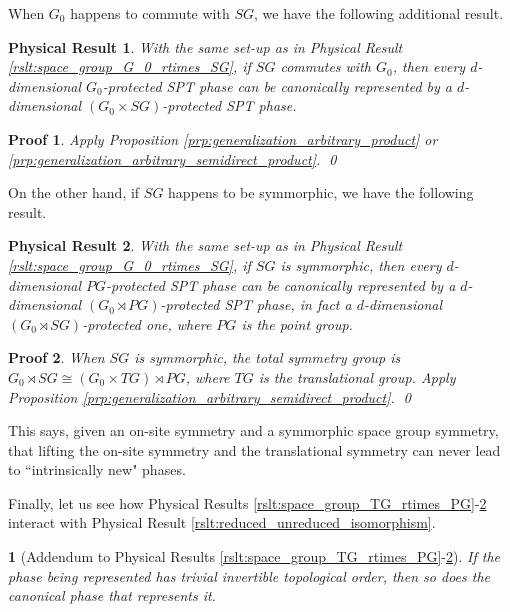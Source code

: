 \documentclass[sort&compress]{elsarticle}
\theoremstyle{theoremstyle}
\theoremstyle{framedtheoremstyle}
\newtheorem{rslt}{Physical Result}
\theoremstyle{definitionstyle}
\theoremstyle{definitionstyle}
\theoremstyle{definitionstyle}
\theoremstyle{definitionstyle}
\theoremstyle{nameddefinitionstyle}
\theoremstyle{framednameddefinitionstyle}
\newtheorem*{framednameddef}{}
\theoremstyle{proofstyle}
\newtheorem{pf}{Proof}
\theoremstyle{definitionstyle}
\newcommand{\isomorphic}{\cong}
\newcommand{\paren}[1]{\left( #1 \right)}
\begin{document}
When $G_0$ happens to commute with $SG$, we have the following additional result.

\begin{framed}\begin{rslt}\label{rslt:space_group_G_0_times_SG}
With the same set-up as in Physical Result \ref{rslt:space_group_G_0_rtimes_SG}, if $SG$ commutes with $G_0$, then every $d$-dimensional $G_0$-protected SPT phase can be canonically represented by a $d$-dimensional $\paren{G_0 \times SG}$-protected SPT phase.
\end{rslt}\end{framed}

\begin{pf}
Apply Proposition \ref{prp:generalization_arbitrary_product} or \ref{prp:generalization_arbitrary_semidirect_product}.
\qed\end{pf}

On the other hand, if $SG$ happens to be symmorphic, we have the following result.

\begin{framed}\begin{rslt}\label{rslt:space_group_G_0_times_TG_rtimes_PG}
With the same set-up as in Physical Result \ref{rslt:space_group_G_0_rtimes_SG}, if $SG$ is symmorphic, then every $d$-dimensional $PG$-protected SPT phase can be canonically represented by a $d$-dimensional $\paren{G_0 \rtimes PG}$-protected SPT phase, in fact a $d$-dimensional $\paren{G_0 \rtimes SG}$-protected one, where $PG$ is the point group.
\end{rslt}\end{framed}

\begin{pf}
When $SG$ is symmorphic, the total symmetry group is $G_0 \rtimes SG \isomorphic \paren{G_0 \times TG} \rtimes PG$, where $TG$ is the translational group. Apply Proposition \ref{prp:generalization_arbitrary_semidirect_product}.
\qed\end{pf}

This says, given an on-site symmetry and a symmorphic space group symmetry, that lifting the on-site symmetry and the translational symmetry can never lead to ``intrinsically new" phases.

Finally, let us see how Physical Results \ref{rslt:space_group_TG_rtimes_PG}-\ref{rslt:space_group_G_0_times_TG_rtimes_PG} interact with Physical Result \ref{rslt:reduced_unreduced_isomorphism}.

\begin{framed}\begin{framednameddef}[Addendum to Physical Results \ref{rslt:space_group_TG_rtimes_PG}-\ref{rslt:space_group_G_0_times_TG_rtimes_PG}]
If the phase being represented has trivial invertible topological order, then so does the canonical phase that represents it.
\end{framednameddef}\end{framed}
\end{document}
